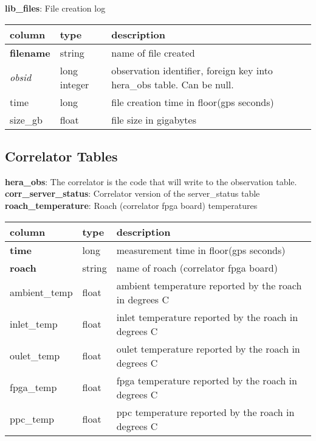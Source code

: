 \documentclass{article}
\begin{document}
\textbf{\large{lib\_files}}: File creation log
\begin{center}
 \begin{tabular}{| p{4cm} | p{2cm} | p{10cm} |} 
\hline
 column & type & description \\ [0.5ex]  \hline\hline
\textbf{filename} & string & name of file created \\ \hline
\textit{obsid} & long integer & observation identifier, foreign key into hera\_obs table. Can be null. \\ \hline
time & long & file creation time in floor(gps seconds)\\ \hline
size\_gb & float & file size in gigabytes \\ \hline
\end{tabular}
\end{center}

\subsection{Correlator Tables}
\textbf{\large{hera\_obs}}: The correlator is the code that will write to the observation table.\\

\textbf{\large{corr\_server\_status}}: Correlator version of the server\_status table\\

\textbf{\large{roach\_temperature}}: Roach (correlator fpga board) temperatures
\begin{center}
 \begin{tabular}{| p{4cm} | p{2cm} | p{10cm} |}
\hline
 column & type & description \\ [0.5ex]  \hline\hline
\textbf{time} & long & measurement time in floor(gps seconds)\\ \hline
\textbf{roach} & string & name of roach (correlator fpga board) \\ \hline
ambient\_temp & float & ambient temperature reported by the roach in degrees C \\\hline
inlet\_temp & float & inlet temperature reported by the roach in degrees C \\\hline
oulet\_temp & float & oulet temperature reported by the roach in degrees C \\\hline
fpga\_temp & float & fpga temperature reported by the roach in degrees C \\\hline
ppc\_temp & float & ppc temperature reported by the roach in degrees C \\\hline
\end{tabular}
\end{center}
\end{document}
